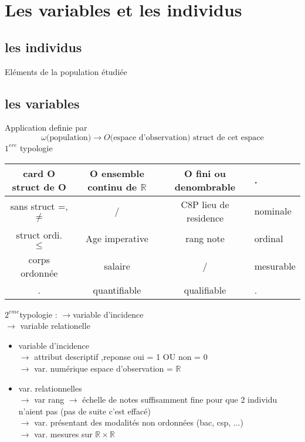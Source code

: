 \documentclass[a4paper]{report}
\begin{document}
\section{Les variables et les individus}
\subsection{les individus}
Eléments de la population étudiée
\subsection{les variables}
Application definie par
  $$ \omega \text{(population)} \longrightarrow O \text{(espace d'observation) struct de cet espace}$$
  $1^{ere}$ typologie \\


\begin{tabular}
  {|c|c|c|l|}
  \hline
  card O \/ struct de O & O ensemble continu de $\mathbb{R}$ & O fini ou denombrable & . \\
  \hline
  sans struct =, $\ne$ & / & C8P lieu de residence & nominale \\
  \hline
  struct ordi. $\leq$  & Age imperative & rang note & ordinal \\
  \hline
  corps ordonnée & salaire & / & mesurable \\
  \hline
  . & quantifiable & qualifiable & . \\
  \hline
\end{tabular}
\vspace{1cm}

$2^{eme}$typologie : $\rightarrow $variable d'incidence\\
\hspace{4cm}$\rightarrow$ variable relationelle

\begin{itemize}
  \item variable d'incidence\\
    $\rightarrow$ attribut descriptif ,reponse oui = 1 OU non = 0\\
    $\rightarrow$ var. numérique  espace d'observation = $\mathbb{R}$
  \item var. relationnelles \\
    $\rightarrow$ var rang $\rightarrow$ échelle de notes suffisamment fine pour que 2 individu n'aient pas (pas de suite c'est effacé)\\
    $\rightarrow$ var. présentant des modalités non ordonnées (bac, csp, ...)\\
    $\rightarrow$ var. mesures sur $\mathbb{R} \times \mathbb{R}$
\end{itemize}
\end{document}
